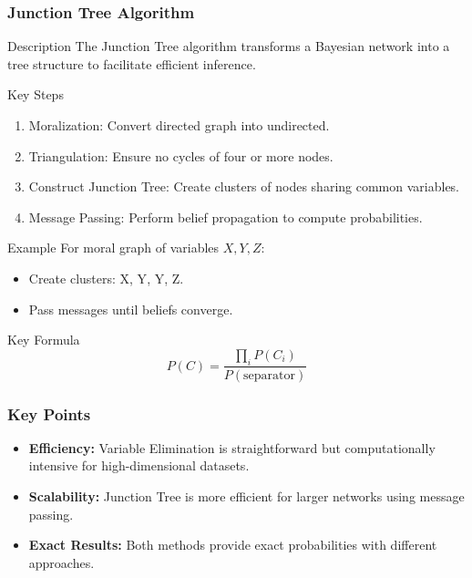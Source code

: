 \documentclass[aspectratio=169]{beamer}
\begin{document}
\begin{frame}[fragile]
    \frametitle{Junction Tree Algorithm}
    \begin{block}{Description}
        The Junction Tree algorithm transforms a Bayesian network into a tree structure to facilitate efficient inference.
    \end{block}

    \begin{block}{Key Steps}
        \begin{enumerate}
            \item Moralization: Convert directed graph into undirected.
            \item Triangulation: Ensure no cycles of four or more nodes.
            \item Construct Junction Tree: Create clusters of nodes sharing common variables.
            \item Message Passing: Perform belief propagation to compute probabilities.
        \end{enumerate}
    \end{block}

    \begin{block}{Example}
        For moral graph of variables \( X, Y, Z \):
        \begin{itemize}
            \item Create clusters: {X, Y}, {Y, Z}.
            \item Pass messages until beliefs converge.
        \end{itemize}
    \end{block}

    \begin{block}{Key Formula}
        \begin{equation}
            P(C) = \frac{\prod_{i} P(C_i)}{P(\text{separator})}
        \end{equation}
    \end{block}
\end{frame}

\begin{frame}[fragile]
    \frametitle{Key Points}
    \begin{itemize}
        \item \textbf{Efficiency:} Variable Elimination is straightforward but computationally intensive for high-dimensional datasets.
        \item \textbf{Scalability:} Junction Tree is more efficient for larger networks using message passing.
        \item \textbf{Exact Results:} Both methods provide exact probabilities with different approaches.
    \end{itemize}
\end{frame}
\end{document}
